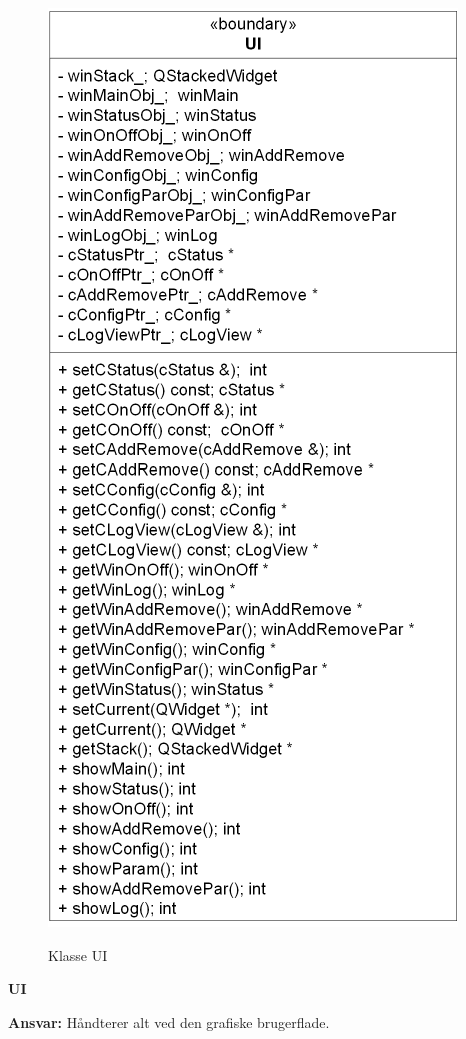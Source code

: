
\begin{figure}[htbp] \centering
{\includegraphics[scale=1.5]{filer/design/Klassediagrammer/sw_UI}}
\caption{Klasse UI}
\label{fig:UI klassediagram}
\end{figure} 

{\centering
\textbf{UI}\par
}
\textbf{Ansvar:} Håndterer alt ved den grafiske brugerflade. \

